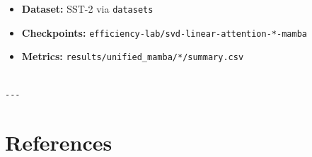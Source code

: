 \begin{itemize}
\item \textbf{Dataset:} SST-2 via \texttt{datasets}
\item \textbf{Checkpoints:} \texttt{efficiency-lab/svd-linear-attention-*-mamba}
\item \textbf{Metrics:} \texttt{results/unified\_mamba/*/summary.csv}
\end{itemize}
\begin{lstlisting}

---
\end{lstlisting}

\section{References}

